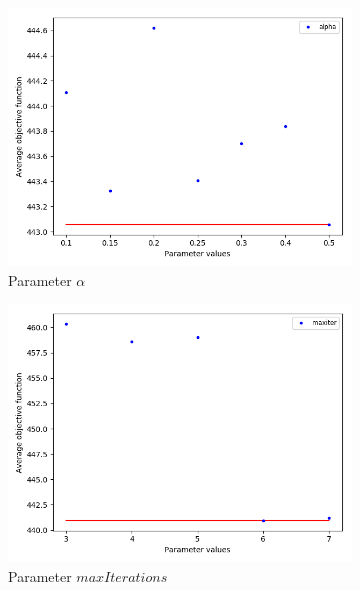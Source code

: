 \begin{figure}
\begin{subfigure}[b]{.49\linewidth}
\centering
\includegraphics[width=\linewidth]{./img/best-alpha.png}
\caption{ Parameter $\alpha$}\label{fig1a}
\end{subfigure}\hfill
\begin{subfigure}[b]{.49\linewidth}
\centering
\includegraphics[width=\linewidth]{./img/best-maxiter.png}
\caption{Parameter $maxIterations$ }\label{fig1b}
\end{subfigure}\vfill
\begin{subfigure}[b]{.49\linewidth}
\centering

\end{subfigure}
\end{figure}
